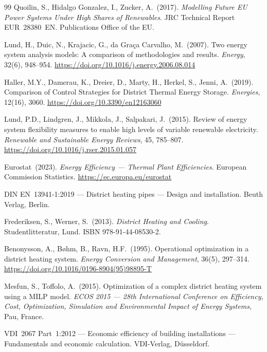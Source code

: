 \documentclass[a4paper,12pt]{article}
\begin{document}
\begin{thebibliography}{99}
Quoilin, S., Hidalgo Gonzalez, I., Zucker, A.\ (2017).
\textit{Modelling Future EU Power Systems Under High Shares of Renewables}.
JRC Technical Report EUR~28380~EN. Publications Office of the EU.

Lund, H., Duic, N., Krajacic, G., da Gra\c{c}a Carvalho, M.\ (2007).
Two energy system analysis models: A comparison of methodologies and results.
\textit{Energy}, 32(6), 948--954.
\url{https://doi.org/10.1016/j.energy.2006.08.014}

Haller, M.Y., Damerau, K., Dreier, D., Marty, H., Herkel, S., Jenni, A.\ (2019).
Comparison of Control Strategies for District Thermal Energy Storage.
\textit{Energies}, 12(16), 3060.
\url{https://doi.org/10.3390/en12163060}

Lund, P.D., Lindgren, J., Mikkola, J., Salpakari, J.\ (2015).
Review of energy system flexibility measures to enable high levels of variable renewable
electricity.
\textit{Renewable and Sustainable Energy Reviews}, 45, 785--807.
\url{https://doi.org/10.1016/j.rser.2015.01.057}

Eurostat\ (2023).
\textit{Energy Efficiency --- Thermal Plant Efficiencies}.
European Commission Statistics. \url{https://ec.europa.eu/eurostat}

DIN EN~13941-1:2019 --- District heating pipes --- Design and installation.
Beuth Verlag, Berlin.

Frederiksen, S., Werner, S.\ (2013).
\textit{District Heating and Cooling}. Studentlitteratur, Lund.
ISBN 978-91-44-08530-2.

Benonysson, A., B\o{}hm, B., Ravn, H.F.\ (1995).
Operational optimization in a district heating system.
\textit{Energy Conversion and Management}, 36(5), 297--314.
\url{https://doi.org/10.1016/0196-8904(95)98895-T}

Mesfun, S., Toffolo, A.\ (2015).
Optimization of a complex district heating system using a MILP model.
\textit{ECOS 2015 --- 28th International Conference on Efficiency, Cost, Optimization,
Simulation and Environmental Impact of Energy Systems}, Pau, France.

VDI~2067 Part~1:2012 --- Economic efficiency of building installations --- Fundamentals
and economic calculation.
VDI-Verlag, D\"{u}sseldorf.


\end{thebibliography}
\end{document}
